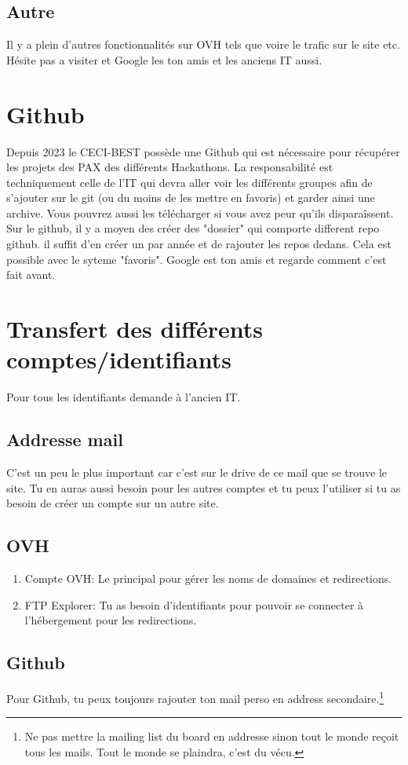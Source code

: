 \documentclass[12pt]{article}
\begin{document}
	\subsection{Autre}
		Il y a plein d'autres fonctionnalités sur OVH tels que voire le trafic sur le site etc. Hésite pas a visiter et Google les ton amis et les anciens IT aussi.
		
\section{Github}
	Depuis 2023 le CECI-BEST possède une Github qui est nécessaire pour récupérer les projets des PAX des différents Hackathons. La responsabilité est techniquement celle de l'IT qui devra aller voir les différents groupes afin de s'ajouter sur le git (ou du moins de les mettre en favoris) et garder ainsi une archive. Vous pouvrez aussi les télécharger si vous avez peur qu'ils disparaîssent. 
	Sur le github, il y a moyen des créer des "dossier" qui comporte different repo github. il suffit d'en créer un par année et de rajouter les repos dedans. Cela est possible avec le syteme "favoris".
	Google est ton amis et regarde comment c'est fait avant.
	
\section{Transfert des différents comptes/identifiants}
	Pour tous les identifiants demande à l'ancien IT.
	\subsection{Addresse mail}
		C'est un peu le plus important car c'est sur le drive de ce mail que se trouve le site. Tu en auras aussi besoin pour les autres comptes et tu peux l'utiliser si tu as besoin de créer un compte sur un autre site.
	\subsection{OVH}
		\begin{enumerate}
			\item Compte OVH: Le principal pour gérer les noms de domaines et redirections.
			\item FTP Explorer: Tu as besoin d'identifiants pour pouvoir se connecter à l'hébergement pour les redirections.
		\end{enumerate}

	\subsection{Github}
		Pour Github, tu peux toujours rajouter ton mail perso en address secondaire.\footnote{Ne pas mettre la mailing list du board en addresse sinon tout le monde reçoit tous les mails. Tout le monde se plaindra, c'est du vécu.}
	
\end{document}

